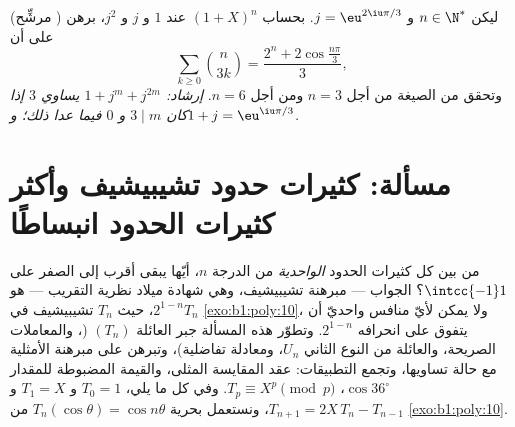 \begin{exercise}[$\star\star$]\label{exo:b1:poly:12}
(مرشِّح ) ليكن $n \in \N^*$ و $j = \eu^{2\iu\pi/3}$.
بحساب $(1 + X)^n$ عند $1$ و $j$ و $j^2$، برهن على أن
\[
\sum_{k \geq 0} \binom{n}{3k}
= \frac{2^n + 2\cos\frac{n\pi}{3}}{3} ,
\]
وتحقق من الصيغة من أجل $n = 3$ ومن أجل $n = 6$. \emph{إرشاد: $1 +
j^m + j^{2m}$ يساوي $3$ إذا كان $3 \mid m$ و $0$ فيما عدا ذلك؛ و$1 +
j = \eu^{\iu\pi/3}$.}
\end{exercise}

\section{مسألة: كثيرات حدود تشيبيشيف وأكثر كثيرات الحدود انبساطًا}

\begin{problem}\label{pb:b1:poly:1}
من بين كل كثيرات الحدود \emph{الواحدية} من الدرجة $n$، أيّها يبقى
أقرب إلى الصفر على $\intcc{-1}1$؟ الجواب --- مبرهنة تشيبيشيف،
وهي شهادة ميلاد نظرية التقريب --- هو
$2^{1-n}T_n$، حيث $T_n$  تشيبيشيف في
\cref{exo:b1:poly:10}، ولا يمكن لأيّ منافس واحديّ أن يتفوق على
انحرافه $2^{1-n}$. وتطوّر هذه المسألة
جبر العائلة $(T_n)$ (، والمعاملات
الصريحة، والعائلة من النوع الثاني $U_n$، ومعادلة
تفاضلية)، وتبرهن على مبرهنة الأمثلية مع حالة
تساويها، وتجمع التطبيقات: عقد المقايسة المثلى،
والقيمة المضبوطة للمقدار $\cos 36^\circ$، 
$T_p \equiv X^p \pmod p$. وفي كل ما يلي، $T_0 = 1$ و $T_1 = X$ و
$T_{n+1} = 2X\,T_n - T_{n-1}$، ونستعمل بحرية
$T_n(\cos\theta) = \cos n\theta$ من \cref{exo:b1:poly:10}.


\end{problem}
